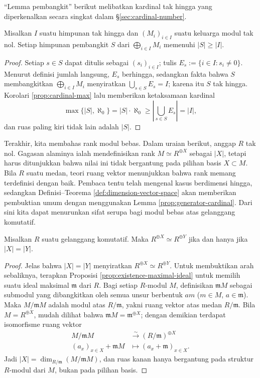 ``Lemma pembangkit'' berikut melibatkan kardinal tak hingga yang diperkenalkan secara singkat dalam \S\ref{sec:cardinal-number}.
\begin{lemma}\label{prop:generator-cardinal}
	Misalkan $I$ suatu himpunan tak hingga dan $(M_i)_{i \in I}$ suatu keluarga modul tak nol. Setiap himpunan pembangkit $S$ dari $\bigoplus_{i \in I} M_i$ memenuhi $|S| \geq |I|$.
\end{lemma}
\begin{proof}
	Setiap $s \in S$ dapat ditulis sebagai $(s_i)_{i \in I}$; tulis $E_s := \{i \in I: s_i \neq 0\}$. Menurut definisi jumlah langsung, $E_s$ berhingga, sedangkan fakta bahwa $S$ membangkitkan $\bigoplus_{i \in I} M_i$ menyiratkan $\bigcup_{s \in S} E_s = I$; karena itu $S$ tak hingga. Korolari \ref{prop:cardinal-max} lalu memberikan ketaksamaan kardinal
	\[ \max\{|S|, \aleph_0 \} = |S| \cdot \aleph_0 \geq \left| \bigcup_{s \in S} E_s \right| = |I|, \]
	dan ruas paling kiri tidak lain adalah $|S|$.
\end{proof}

Terakhir, kita membahas rank modul bebas. Dalam uraian berikut, anggap $R$ tak nol. Gagasan alaminya ialah mendefinisikan rank $M \simeq R^{\oplus X}$ sebagai $|X|$, tetapi harus ditunjukkan bahwa nilai ini tidak bergantung pada pilihan basis $X \subset M$. Bila $R$ suatu medan, teori ruang vektor menunjukkan bahwa rank memang terdefinisi dengan baik. Pembaca tentu telah mengenal kasus berdimensi hingga, sedangkan Definisi--Teorema \ref{def:dimension-vector-space} akan memberikan pembuktian umum dengan menggunakan Lemma \ref{prop:generator-cardinal}. Dari sini kita dapat menurunkan sifat serupa bagi modul bebas atas gelanggang komutatif.

\begin{proposition}
	Misalkan $R$ suatu gelanggang komutatif. Maka $R^{\oplus X} \simeq R^{\oplus Y}$ jika dan hanya jika $|X|=|Y|$.
\end{proposition}
\begin{proof}
	Jelas bahwa $|X|=|Y|$ menyiratkan $R^{\oplus X} \simeq R^{\oplus Y}$. Untuk membuktikan arah sebaliknya, terapkan Proposisi \ref{prop:existence-maximal-ideal} untuk memilih suatu ideal maksimal $\mathfrak{m}$ dari $R$. Bagi setiap $R$-modul $M$, definisikan $\mathfrak{m} M$ sebagai submodul yang dibangkitkan oleh semua unsur berbentuk $am$ ($m \in M$, $a \in \mathfrak{m}$). Maka $M/\mathfrak{m}M$ adalah modul atas $R/\mathfrak{m}$, yakni ruang vektor atas medan $R/\mathfrak{m}$. Bila $M = R^{\oplus X}$, mudah dilihat bahwa $\mathfrak{m}M = \mathfrak{m}^{\oplus X}$; dengan demikian terdapat isomorfisme ruang vektor
	\begin{align*}
		M/\mathfrak{m}M & \stackrel{\sim}{\longrightarrow} (R/\mathfrak{m})^{\oplus X} \\
		(a_x)_{x \in X} + \mathfrak{m}M & \longmapsto (a_x + \mathfrak{m})_{x \in X}.
	\end{align*}
	Jadi $|X| = \dim_{R/\mathfrak{m}} (M/\mathfrak{m}M)$, dan ruas kanan hanya bergantung pada struktur $R$-modul dari $M$, bukan pada pilihan basis.
\end{proof}

